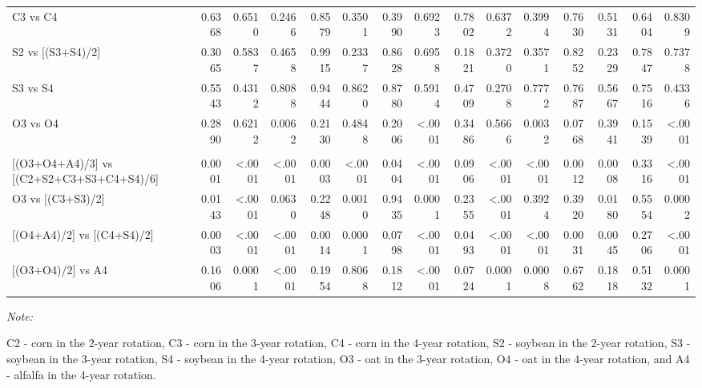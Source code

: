 \documentclass[
]{article}
\begin{document}
\begin{landscape}
\begin{table}
{\begin{threeparttable}
\begin{tabular}[t]{lrrrrrr>{}r|rrrrrrr}
\hspace{1em}C3 vs C4 & 0.6368 & 0.6510 & 0.2466 & 0.8579 & 0.3501 & 0.3990 & 0.6923 & 0.7802 & 0.6372 & 0.3994 & 0.7630 & 0.5131 & 0.6404 & 0.8309\\
\hspace{1em}S2 vs [(S3+S4)/2] & 0.3065 & 0.5837 & 0.4658 & 0.9915 & 0.2337 & 0.8628 & 0.6958 & 0.1821 & 0.3720 & 0.3571 & 0.8252 & 0.2329 & 0.7847 & 0.7378\\
\hspace{1em}S3 vs S4 & 0.5543 & 0.4312 & 0.8088 & 0.9444 & 0.8620 & 0.8780 & 0.5914 & 0.4709 & 0.2708 & 0.7772 & 0.7687 & 0.5667 & 0.7516 & 0.4336\\
\hspace{1em}O3 vs O4 & 0.2890 & 0.6212 & 0.0062 & 0.2130 & 0.4848 & 0.2006 & <.0001 & 0.3486 & 0.5666 & 0.0032 & 0.0768 & 0.3941 & 0.1539 & <.0001\\
\addlinespace[0.3em]
\multicolumn{15}{l}{\textbf{(C) - Crop type effects}}\\
\hspace{1em}{}[(O3+O4+A4)/3] vs [(C2+S2+C3+S3+C4+S4)/6] & 0.0001 & <.0001 & <.0001 & 0.0003 & <.0001 & 0.0404 & <.0001 & 0.0906 & <.0001 & <.0001 & 0.0012 & 0.0008 & 0.3316 & <.0001\\
\hspace{1em}O3 vs [(C3+S3)/2] & 0.0143 & <.0001 & 0.0630 & 0.2248 & 0.0010 & 0.9435 & 0.0001 & 0.2355 & <.0001 & 0.3924 & 0.3920 & 0.0180 & 0.5554 & 0.0002\\
\hspace{1em}{}[(O4+A4)/2] vs [(C4+S4)/2] & 0.0003 & <.0001 & <.0001 & 0.0014 & 0.0001 & 0.0798 & <.0001 & 0.0493 & <.0001 & <.0001 & 0.0031 & 0.0045 & 0.2706 & <.0001\\
\hspace{1em}{}[(O3+O4)/2] vs A4 & 0.1606 & 0.0001 & <.0001 & 0.1954 & 0.8068 & 0.1812 & <.0001 & 0.0724 & 0.0001 & 0.0008 & 0.6762 & 0.1818 & 0.5132 & 0.0001\\
\bottomrule
\end{tabular}
\begin{tablenotes}[para]
\item \textit{Note: } 
\item C2 - corn in the 2-year rotation, C3 - corn in the 3-year rotation, C4 - corn in the 4-year rotation, S2 - soybean in the 2-year rotation, S3 - soybean in the 3-year rotation, S4 - soybean in the 4-year rotation, O3 - oat in the 3-year rotation, O4 - oat in the 4-year rotation, and A4 - alfalfa in the 4-year rotation.
\end{tablenotes}
\end{threeparttable}}
\end{table}
\end{landscape}
\end{document}

